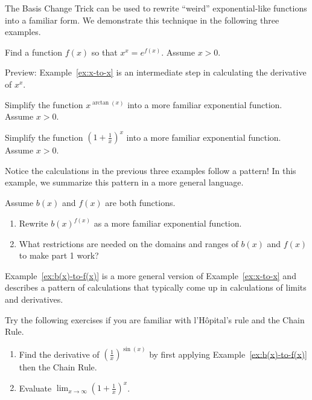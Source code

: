 \documentclass[../main.tex]{subfiles}
\begin{document}
\faStar{} The Basis Change Trick can be used to rewrite ``weird'' exponential-like functions into a familiar form. We demonstrate this technique in the following three examples.

\begin{example} \label{ex:x-to-x}
  Find a function \(f(x)\) so that \(x^{x} = e^{f(x)}\). Assume \(x > 0\).

  {\footnotesize Preview: Example~\ref{ex:x-to-x} is an intermediate step in calculating the derivative of \(x^{x}\).}
\end{example}



\begin{example}
  Simplify the function \(x^{\arctan(x)}\) into a more familiar exponential function. Assume \(x > 0\). 
\end{example}


\begin{example}
  Simplify the function \(\left( 1 + \frac{1}{x} \right)^{x}\) into a more familiar exponential function. Assume \(x > 0\). 
\end{example}


\begin{example} \label{ex:b(x)-to-f(x)}
  Notice the calculations in the previous three examples follow a pattern! In this example, we summarize this pattern in a more general language. 

  Assume \(b(x)\) and \(f(x)\) are both functions. 

  \begin{enumerate}
    \item Rewrite \(b(x)^{f(x)}\) as a more familiar exponential function. 
    \item What restrictions are needed on the domains and ranges of \(b(x)\) and \(f(x)\) to make part 1 work?
  \end{enumerate}
\end{example}

Example~\ref{ex:b(x)-to-f(x)} is a more general version of Example~\ref{ex:x-to-x} and describes a  pattern of calculations that typically come up in calculations of limits and derivatives. 

\begin{example}
  Try the following exercises if you are familiar with l'H\^opital's rule and the Chain Rule.

  \begin{enumerate}
    \item Find the derivative of \(\left(\frac{1}{x}\right)^{\sin(x)}\) by first applying Example~\ref{ex:b(x)-to-f(x)} then the Chain Rule. 


    \item Evaluate \(\lim_{x \to \infty} \left( 1 + \frac{1}{x} \right)^{x}\). 


  \end{enumerate}
\end{example}
\end{document}

